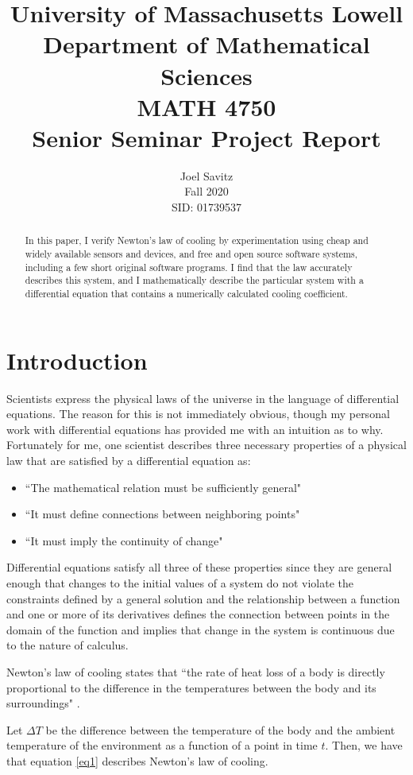 \documentclass[12pt]{article}
\title{ University of Massachusetts Lowell \protect\\
	Department of Mathematical Sciences\protect\\
MATH 4750 \protect\\
Senior Seminar Project Report}
\author{Joel Savitz \\ Fall 2020 \\ SID: 01739537}
\begin{document}
\maketitle

\begin{abstract}
	In this paper,
	I verify Newton's law of cooling by experimentation
	using cheap and widely available sensors and devices,
	and free and open source software systems,
	including a few short original software programs.
	I find that the law accurately describes this system,
	and I mathematically describe the particular system
	with a differential equation
	that contains a numerically calculated cooling coefficient.
\end{abstract}

\section{Introduction}

Scientists express the physical laws of
the universe in the language of differential equations.
The reason for this is not immediately obvious,
though my personal work with differential equations
has provided me with an intuition as to why.
Fortunately for me,
one scientist describes three necessary properties
of a physical law that are satisfied by a differential equation as: 


\begin{itemize}
	\item ``The mathematical relation must be sufficiently general"
	\item ``It must define connections between neighboring points"
	\item ``It must imply the continuity of change"\citep{whydiffeq}
\end{itemize}

Differential equations satisfy all three of these properties
since they are general enough that
changes to the initial values of a system
do not violate the constraints defined by a general solution
and the relationship between a function and one or more of its derivatives
defines the connection between points in the domain of the function
and implies that change in the system is continuous
due to the nature of calculus.


Newton's law of cooling states that
``the rate of heat loss of a body is
directly proportional to the difference
in the temperatures between the body and
its surroundings" \citep{wiki}.

Let $\Delta T$ be the difference between
the temperature of the body
and the ambient temperature of the environment
as a function of a point in time $t$.
Then, we have that equation \ref{eq1}
describes Newton's law of cooling.
\end{document}
